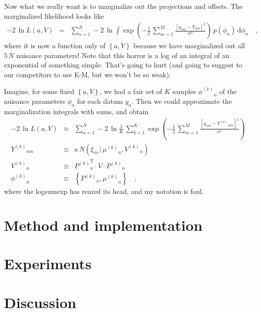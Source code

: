 \documentclass[12pt]{article}
\newcommand{\normal}{N}
\newcommand{\transpose}{^{\mathsf{T}}}
\newcommand{\given}{\,|\,}
\newcommand{\like}{L}
\newcommand{\setof}[1]{\left\{{#1}\right\}}
\newcommand{\dd}{\mathrm{d}}
\newcommand{\kth}[1]{{{#1}^{(k)}}}
\begin{document}
Now what we really want is to marginalize out the projections and
offsets.
The marginalized likelihood looks like
\begin{eqnarray}
  -2\,\ln\like(a,V) &=& \sum_{n=1}^N -2\,\ln \int\exp(-\frac{1}{2}\,\sum_{m=1}^M \frac{[y_{nm} - Y_{nm}]^2}{\sigma^2})\,p(\phi_n)\,\dd\phi_n
  \quad,
\end{eqnarray}
where it is now a function only of $\setof{a,V}$ because we have
marginalized out all $5\,N$ nuisance parameters!
Note that this horror is a log of an integral of an exponential of
something simple.
That's going to hurt (and going to suggest to our competitors to use
E-M, but we won't be so weak).

Imagine, for some fixed $\setof{a, V}$, we had a fair set of $K$
samples $\kth{\phi}_n$ of the nuisance parameters $\phi_n$ for each
datum $y_n$.
Then we could approximate the marginalization integrals with sums, and
obtain
\begin{eqnarray}
  -2\,\ln\like(a,V) &\approx& \sum_{n=1}^N -2\,\ln \frac{1}{K}\,\sum_{k=1}^K\exp(-\frac{1}{2}\,\sum_{m=1}^M \frac{[y_{nm} - \kth{Y}_{nm}]^2}{\sigma^2})
  \\
  \kth{Y}_{nm} &\equiv& a\,\normal(\xi_m\given\kth{\mu}_n,\kth{V}_n)
  \\
  \kth{V}_n &\equiv& \kth{P}_n\transpose\cdot V\cdot \kth{P}_n
  \\
  \kth{\phi}_n &\equiv& \setof{\kth{P}_n, \kth{\mu}_n}
  \quad,
\end{eqnarray}
where the logsumexp has reared its head, and my notation is foul.

\section{Method and implementation}

\section{Experiments}

\section{Discussion}
\end{document}
